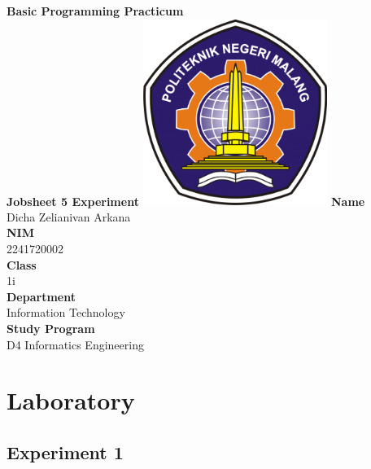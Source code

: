 \documentclass[12pt,titlepage]{article}
\newcommand{\vSubject}{Basic Programming Practicum}
\newcommand{\vSubtitle}{Jobsheet 5 Experiment}
\newcommand{\vName}{Dicha Zelianivan Arkana}
\newcommand{\vNIM}{2241720002}
\newcommand{\vClass}{1i}
\newcommand{\vDepartment}{Information Technology}
\newcommand{\vStudyProgram}{D4 Informatics Engineering}
\begin{document}
\begin{titlepage}
    \centering
    \vfill
    {\bfseries\LARGE
        \vSubject\\
        \vskip0.25cm
        \vSubtitle
    }
    \vfill
    \includegraphics[width=6cm]{images/polinema-logo.png}
    \vfill
    {
        \textbf{Name}\\
        \vName\\
        \vskip0.5cm
        \textbf{NIM}\\
        \vNIM\\
        \vskip0.5cm
        \textbf{Class}\\
        \vClass\\
        \vskip0.5cm
        \textbf{Department}\\
        \vDepartment\\
        \vskip0.5cm
        \textbf{Study Program}\\
        \vStudyProgram
    }
\end{titlepage}

\section{Laboratory}
\subsection{Experiment 1}
\end{document}
